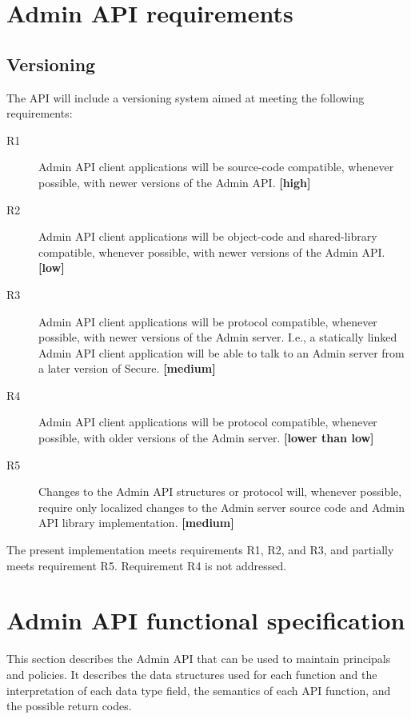 %
%
\section{Admin API requirements}

\subsection{Versioning}

The API will include a versioning system aimed at meeting the
following requirements:
\begin{description}
\item[R1] Admin API client applications will be source-code
	compatible, whenever possible, with newer versions of the
	Admin API. {\bf [high]}
\item[R2] Admin API client applications will be object-code and
	shared-library compatible, whenever possible, with newer
	versions of the Admin API. {\bf [low]}
\item[R3] Admin API client applications will be protocol compatible,
	whenever possible, with newer versions of the Admin server.
	I.e., a statically linked Admin API client application will be
	able to talk to an Admin server from a later version of
	Secure. {\bf [medium]}
\item[R4] Admin API client applications will be protocol compatible,
	whenever possible, with older versions of the Admin server.
	{\bf [lower than low]}
\item[R5] Changes to the Admin API structures or protocol will,
	whenever possible, require only localized changes to the Admin
	server source code and Admin API library implementation. {\bf
	[medium]}
\end{description}
The present implementation meets requirements R1, R2, and R3, and
partially meets requirement R5.  Requirement R4 is not addressed.

\section{Admin API functional specification}

This section describes the Admin API that can be used to maintain
principals and policies.  It describes the data structures used for
each function and the interpretation of each data type field, the
semantics of each API function, and the possible return codes.

